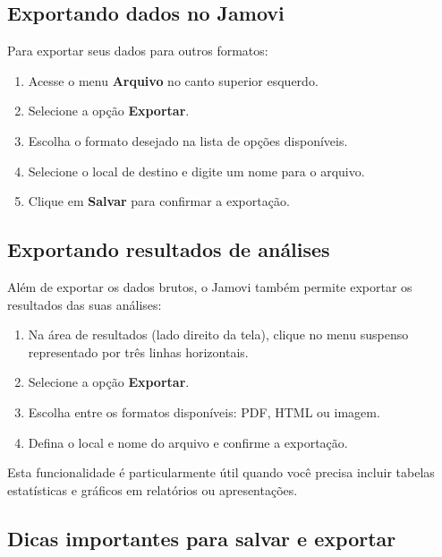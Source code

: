 \subsection{Exportando dados no Jamovi}

Para exportar seus dados para outros formatos:

\begin{enumerate}
    \item Acesse o menu \textbf{Arquivo} no canto superior esquerdo.
    \item Selecione a opção \textbf{Exportar}.
    \item Escolha o formato desejado na lista de opções disponíveis.
    \item Selecione o local de destino e digite um nome para o arquivo.
    \item Clique em \textbf{Salvar} para confirmar a exportação.
\end{enumerate}


\subsection{Exportando resultados de análises}

Além de exportar os dados brutos, o Jamovi também permite exportar os resultados das suas análises:

\begin{enumerate}
    \item Na área de resultados (lado direito da tela), clique no menu suspenso representado por três linhas horizontais.
    \item Selecione a opção \textbf{Exportar}.
    \item Escolha entre os formatos disponíveis: PDF, HTML ou imagem.
    \item Defina o local e nome do arquivo e confirme a exportação.
\end{enumerate}

Esta funcionalidade é particularmente útil quando você precisa incluir tabelas estatísticas e gráficos em relatórios ou apresentações.

\subsection{Dicas importantes para salvar e exportar}


